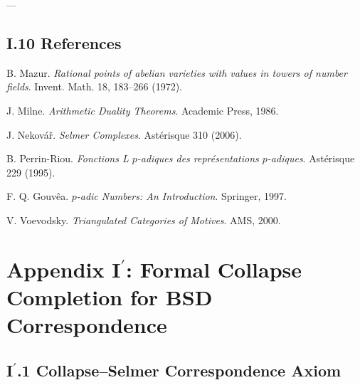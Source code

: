 \documentclass[11pt]{article}
\newcommand{\Sha}{\mathbb{S}}
\begin{document}
\begin{center}
\end{center}

---


\subsection*{I.10 References}

\begin{thebibliography}{9}

B. Mazur.  
\textit{Rational points of abelian varieties with values in towers of number fields}.  
Invent. Math. 18, 183–266 (1972).

J. Milne.  
\textit{Arithmetic Duality Theorems}. Academic Press, 1986.

J. Nekovář.  
\textit{Selmer Complexes}. Astérisque 310 (2006).

B. Perrin-Riou.  
\textit{Fonctions L $p$-adiques des représentations $p$-adiques}. Astérisque 229 (1995).

F. Q. Gouvêa.  
\textit{$p$-adic Numbers: An Introduction}. Springer, 1997.

V. Voevodsky.  
\textit{Triangulated Categories of Motives}. AMS, 2000.

\end{thebibliography}



\section*{Appendix I$^\prime$: Formal Collapse Completion for BSD Correspondence}

\subsection*{I$^\prime$.1 Collapse–Selmer Correspondence Axiom}
\end{document}
